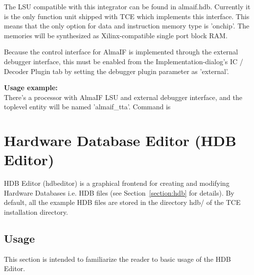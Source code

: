 \documentclass[twoside]{tceusermanual}
\begin{document}
The LSU compatible with this integrator can be found in almaif.hdb. Currently
it is the only function unit shipped with TCE which implements this interface.
This means that the only option for data and instruction memory type is
'onchip'. The memories will be synthesized as Xilinx-compatible single port
block RAM.

Because the control interface for AlmaIF is implemented through the external
debugger interface, this must be enabled from the Implementation-dialog's
IC / Decoder Plugin tab by setting the debugger plugin parameter as 'external'.

\textbf{Usage example:} \\
There's a processor with AlmaIF LSU and external debugger interface, and the
toplevel entity will be named 'almaif\_tta'. Command is



\section{Hardware Database Editor (HDB Editor)}
\label{sec:hdbedit}
 

HDB Editor (hdbeditor) is a graphical frontend for creating and
modifying Hardware Databases i.e. HDB files (see Section~\ref{section:hdb}
for details). By default, all the example HDB files are stored in the directory
hdb/ of the TCE installation directory.

\subsection{Usage}

This section is intended to familiarize the reader to basic usage of the HDB
Editor.
\end{document}
